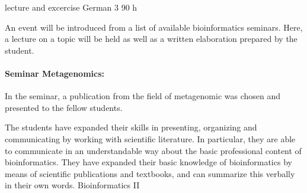 {lecture and excercise}
{German}
{3}
{90 h}
{An event will be introduced from a list of available bioinformatics seminars. Here, a lecture on a topic will be held as well as a written elaboration prepared by the student.
\paragraph{Seminar Metagenomics:} In the seminar, a publication from the field of metagenomic was chosen and presented to the fellow students.
} 
{The students have expanded their skills in presenting, organizing and communicating by working with scientific literature. In particular, they are able to communicate in an understandable way about the basic professional content of bioinformatics. They have expanded their basic knowledge of bioinformatics by means of scientific publications and textbooks, and can summarize this verbally in their own words.
}
{Bioinformatics II}